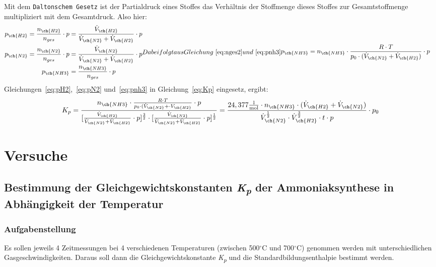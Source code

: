 \documentclass{scrartcl}
\begin{document}
Mit dem \texttt{Daltonschem Gesetz} ist der Partialdruck eines Stoffes das Verhältnis der Stoffmenge dieses Stoffes zur Gesamtstoffmenge multipliziert mit dem Gesamtdruck. Also hier:
\begin{subequations}
	\begin{align}
		p_{\ch{H2}} = \frac{n_{\ch{H2}}}{n_{ges}}\cdot p &= \frac{\dot{V}_{\ch{H2}}}{\dot{V}_{\ch{N2}} + \dot{V}_{\ch{H2}}}\cdot p \label{eq:pH2} \\
		p_{\ch{N2}} = \frac{n_{\ch{N2}}}{n_{ges}}\cdot p &= \frac{\dot{V}_{\ch{N2}}}{\dot{V}_{\ch{N2}} + \dot{V}_{\ch{H2}}}\cdot p \label{eq:pN2} \\
		p_{\ch{NH3}} &= \frac{n_{\ch{NH3}}}{n_{ges}}\cdot p \label{eq:pnh3}
	\end{align}
	 Dabei folgt aus Gleichung~\ref{eq:nges2} und~\ref{eq:pnh3}
	\begin{align}
		p_{\ch{NH3}} &= n_{\ch{NH3}}\cdot\frac{R\cdot T}{p_0\cdot(\dot{V}_{\ch{N2}}+\dot{V}_{\ch{H2}})}\cdot p
	\end{align}
\end{subequations}
Gleichungen~\ref{eq:pH2},~\ref{eq:pN2} und~\ref{eq:pnh3} in Gleichung~\ref{eq:Kp} eingesetz, ergibt:
\begin{equation}
	K_p = \frac{n_{\ch{NH3}}\cdot\frac{R\cdot T}{p_0\cdot(\dot{V}_{\ch{N2}}+\cdot{V}_{\ch{H2}}}\cdot p}{[\frac{\dot{V}_{\ch{H2}}}{\dot{V}_{\ch{N2}} + \dot{V}_{\ch{H2}}}\cdot p]^{\frac{3}{2}}\cdot [\frac{\dot{V}_{\ch{N2}}}{\dot{V}_{\ch{N2}} + \dot{V}_{\ch{H2}}}\cdot p]^{\frac{1}{2}}} = \frac{24,377\frac{\text{l}}{\text{mol}}\cdot n_{\ch{NH3}}\cdot(\dot{V}_{\ch{H2}} + \dot{V}_{\ch{N2}})}{\dot{V}_{\ch{N2}}^{\frac{1}{2}}\cdot\dot{V}_{\ch{H2}}^{\frac{3}{2}}\cdot t\cdot p}\cdot p_0
\end{equation}
\section{Versuche}
\subsection{Bestimmung der Gleichgewichtskonstanten \emph{K\textsubscript{\emph{p}}} der Ammoniaksynthese in Abhängigkeit der Temperatur}
\subsubsection{Aufgabenstellung}
Es sollen jeweils 4 Zeitmessungen bei 4 verschiedenen Temperaturen (zwischen 500$^\circ$C und 700$^\circ$C) genommen werden mit unterschiedlichen Gasgeschwindigkeiten. Daraus soll dann die Gleichgewichtskonstante \emph{K\textsubscript{\emph{p}}} und die Standardbildungsenthalpie bestimmt werden.
\end{document}
